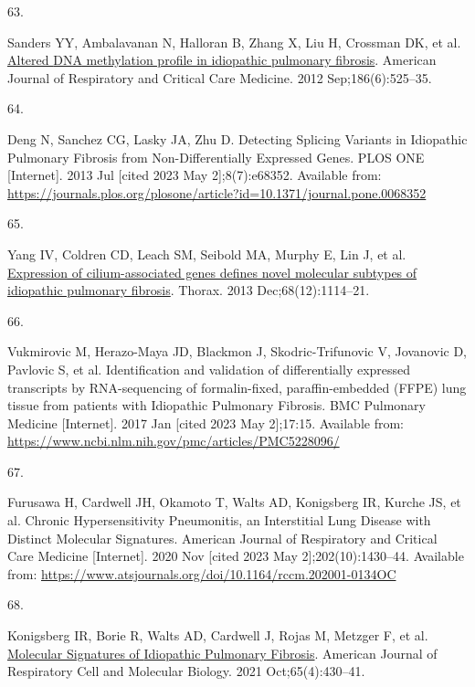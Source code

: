 \documentclass[
]{article}
\newlength{\cslhangindent}
\newlength{\csllabelwidth}
\newlength{\cslentryspacingunit} %
\newenvironment{CSLReferences}[2] %
 {%
  \setlength{\parindent}{0pt}
  \ifodd #1
  \let\oldpar\par
  \def\par{\hangindent=\cslhangindent\oldpar}
  \fi
  \setlength{\parskip}{#2\cslentryspacingunit}
 }%
 {}
\newcommand{\CSLLeftMargin}[1]{\parbox[t]{\csllabelwidth}{#1}}
\newcommand{\CSLRightInline}[1]{\parbox[t]{\linewidth - \csllabelwidth}{#1}\break}
\begin{document}
\begin{CSLReferences}{0}{0}
\leavevmode{}%
\CSLLeftMargin{63. }%
\CSLRightInline{Sanders YY, Ambalavanan N, Halloran B, Zhang X, Liu H, Crossman DK, et al. \href{https://doi.org/10.1164/rccm.201201-0077OC}{Altered {DNA} methylation profile in idiopathic pulmonary fibrosis}. American Journal of Respiratory and Critical Care Medicine. 2012 Sep;186(6):525--35. }

\leavevmode{}%
\CSLLeftMargin{64. }%
\CSLRightInline{Deng N, Sanchez CG, Lasky JA, Zhu D. Detecting {Splicing} {Variants} in {Idiopathic} {Pulmonary} {Fibrosis} from {Non}-{Differentially} {Expressed} {Genes}. PLOS ONE {[}Internet{]}. 2013 Jul {[}cited 2023 May 2{]};8(7):e68352. Available from: \url{https://journals.plos.org/plosone/article?id=10.1371/journal.pone.0068352}}

\leavevmode{}%
\CSLLeftMargin{65. }%
\CSLRightInline{Yang IV, Coldren CD, Leach SM, Seibold MA, Murphy E, Lin J, et al. \href{https://doi.org/10.1136/thoraxjnl-2012-202943}{Expression of cilium-associated genes defines novel molecular subtypes of idiopathic pulmonary fibrosis}. Thorax. 2013 Dec;68(12):1114--21. }

\leavevmode{}%
\CSLLeftMargin{66. }%
\CSLRightInline{Vukmirovic M, Herazo-Maya JD, Blackmon J, Skodric-Trifunovic V, Jovanovic D, Pavlovic S, et al. Identification and validation of differentially expressed transcripts by {RNA}-sequencing of formalin-fixed, paraffin-embedded ({FFPE}) lung tissue from patients with {Idiopathic} {Pulmonary} {Fibrosis}. BMC Pulmonary Medicine {[}Internet{]}. 2017 Jan {[}cited 2023 May 2{]};17:15. Available from: \url{https://www.ncbi.nlm.nih.gov/pmc/articles/PMC5228096/}}

\leavevmode{}%
\CSLLeftMargin{67. }%
\CSLRightInline{Furusawa H, Cardwell JH, Okamoto T, Walts AD, Konigsberg IR, Kurche JS, et al. Chronic {Hypersensitivity} {Pneumonitis}, an {Interstitial} {Lung} {Disease} with {Distinct} {Molecular} {Signatures}. American Journal of Respiratory and Critical Care Medicine {[}Internet{]}. 2020 Nov {[}cited 2023 May 2{]};202(10):1430--44. Available from: \url{https://www.atsjournals.org/doi/10.1164/rccm.202001-0134OC}}

\leavevmode{}%
\CSLLeftMargin{68. }%
\CSLRightInline{Konigsberg IR, Borie R, Walts AD, Cardwell J, Rojas M, Metzger F, et al. \href{https://doi.org/10.1165/rcmb.2020-0546OC}{Molecular {Signatures} of {Idiopathic} {Pulmonary} {Fibrosis}}. American Journal of Respiratory Cell and Molecular Biology. 2021 Oct;65(4):430--41. }


\end{CSLReferences}
\end{document}
